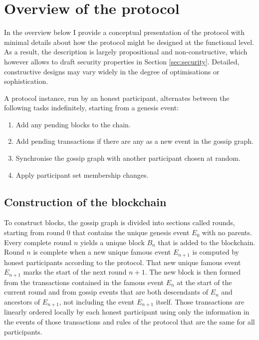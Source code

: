 \documentclass[a4paper,11pt]{article}
\begin{document}
\section{Overview of the protocol}

In the overview below I provide a conceptual presentation of the protocol with minimal details about
how the protocol might be designed at the functional level. As a result, the description is largely
propositional and non-constructive, which however allows to draft security properties in Section
\ref{sec:security}. Detailed, constructive designs may vary widely in the degree of optimisations or
sophistication.

A protocol instance, run by an honest participant, alternates between the following tasks
indefinitely, starting from a genesis event:

\begin{enumerate}
\item Add any pending blocks to the chain.
\item Add pending transactions if there are any as a new event in the gossip graph.
\item Synchronise the gossip graph with another participant chosen at random.
\item Apply participant set membership changes.
\end{enumerate}


\subsection{Construction of the blockchain}

To construct blocks, the gossip graph is divided into sections called rounds, starting from round 0
that contains the unique genesis event $E_0$ with no parents. Every complete round $n$ yields a
unique block $B_n$ that is added to the blockchain. Round $n$ is complete when a new unique famous
event $E_{n+1}$ is computed by honest participants according to the protocol. That new unique famous
event $E_{n+1}$ marks the start of the next round $n + 1$. The new block is then formed from the
transactions contained in the famous event $E_n$ at the start of the current round and from gossip
events that are both descendants of $E_n$ and ancestors of $E_{n+1}$, not including the event
$E_{n+1}$ itself. Those transactions are linearly ordered locally by each honest participant using
only the information in the events of those transactions and rules of the protocol that are the same
for all participants.
\end{document}
